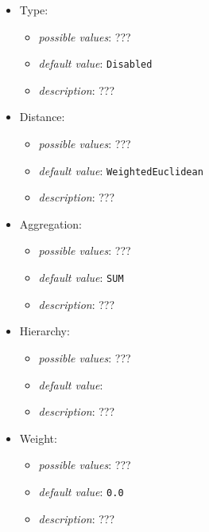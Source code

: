 \documentclass{article}
\begin{document}
\begin{itemize}
    \item Type:
           \begin{itemize}
                \item \emph{possible values}: ???
                \item \emph{default value}: \texttt{Disabled}
                \item \emph{description}: ???
           \end{itemize}
    \item Distance:
           \begin{itemize}
                \item \emph{possible values}: ???
                \item \emph{default value}: \texttt{WeightedEuclidean}
                \item \emph{description}: ???
           \end{itemize}
    \item Aggregation:
           \begin{itemize}
                \item \emph{possible values}: ???
                \item \emph{default value}: \texttt{SUM}
                \item \emph{description}: ???
           \end{itemize}
    \item Hierarchy:
           \begin{itemize}
                \item \emph{possible values}: ???
                \item \emph{default value}: \texttt{}
                \item \emph{description}: ???
           \end{itemize}
    \item Weight:
           \begin{itemize}
                \item \emph{possible values}: ???
                \item \emph{default value}: \texttt{0.0}
                \item \emph{description}: ???
           \end{itemize}
\end{itemize}
\end{document}
